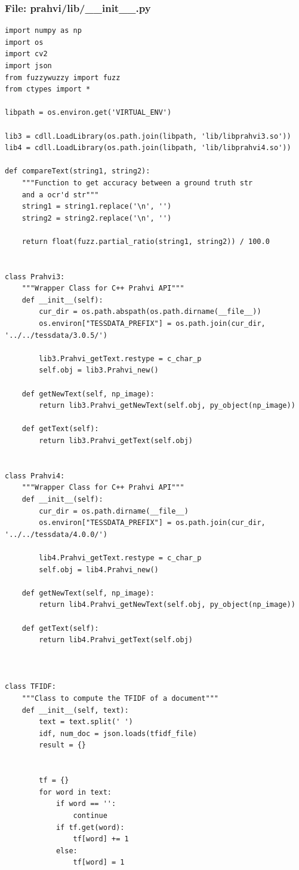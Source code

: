 \subsubsection{File: prahvi/lib/\_\_init\_\_.py}
\begin{lstlisting}
import numpy as np
import os
import cv2
import json
from fuzzywuzzy import fuzz
from ctypes import *

libpath = os.environ.get('VIRTUAL_ENV')

lib3 = cdll.LoadLibrary(os.path.join(libpath, 'lib/libprahvi3.so'))
lib4 = cdll.LoadLibrary(os.path.join(libpath, 'lib/libprahvi4.so'))

def compareText(string1, string2):
    """Function to get accuracy between a ground truth str
    and a ocr'd str"""
    string1 = string1.replace('\n', '')
    string2 = string2.replace('\n', '')

    return float(fuzz.partial_ratio(string1, string2)) / 100.0


class Prahvi3:
    """Wrapper Class for C++ Prahvi API"""
    def __init__(self):
        cur_dir = os.path.abspath(os.path.dirname(__file__))
        os.environ["TESSDATA_PREFIX"] = os.path.join(cur_dir, '../../tessdata/3.0.5/')

        lib3.Prahvi_getText.restype = c_char_p
        self.obj = lib3.Prahvi_new()

    def getNewText(self, np_image):
        return lib3.Prahvi_getNewText(self.obj, py_object(np_image))

    def getText(self):
        return lib3.Prahvi_getText(self.obj)


class Prahvi4:
    """Wrapper Class for C++ Prahvi API"""
    def __init__(self):
        cur_dir = os.path.dirname(__file__)
        os.environ["TESSDATA_PREFIX"] = os.path.join(cur_dir, '../../tessdata/4.0.0/')

        lib4.Prahvi_getText.restype = c_char_p
        self.obj = lib4.Prahvi_new()

    def getNewText(self, np_image):
        return lib4.Prahvi_getNewText(self.obj, py_object(np_image))

    def getText(self):
        return lib4.Prahvi_getText(self.obj)



class TFIDF:
    """Class to compute the TFIDF of a document"""
    def __init__(self, text):
        text = text.split(' ')
        idf, num_doc = json.loads(tfidf_file)
        result = {}


        tf = {}
        for word in text:
            if word == '':
                continue
            if tf.get(word):
                tf[word] += 1
            else:
                tf[word] = 1


\end{lstlisting}
